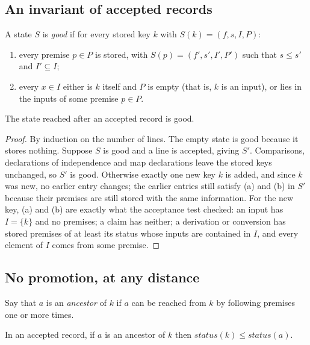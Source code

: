 \subsection{An invariant of accepted records}

\begin{definition}\label{def:good}
A state $S$ is \emph{good} if for every stored key $k$ with $S(k)=(f,s,I,P)$:
\begin{enumerate}[label=(\alph*),nosep,leftmargin=2em]
\item every premise $p\in P$ is stored, with $S(p)=(f',s',I',P')$ such that $s\le s'$ and $I'\subseteq I$;
\item every $x\in I$ either is $k$ itself and $P$ is empty (that is, $k$ is an input), or lies in the inputs of some premise $p\in P$.
\end{enumerate}
\end{definition}

\begin{theorem}\label{thm:good}
The state reached after an accepted record is good.
\end{theorem}

\begin{proof}
By induction on the number of lines. The empty state is good because it stores nothing. Suppose $S$ is good and a line is accepted,
giving $S'$. Comparisons, declarations of independence and map declarations leave the stored keys unchanged, so $S'$ is good. Otherwise
exactly one new key $k$ is added, and since $k$ was new, no earlier entry changes; the earlier entries still satisfy (a) and (b) in $S'$
because their premises are still stored with the same information. For the new key, (a) and (b) are exactly what the acceptance test
checked: an input has $I=\{k\}$ and no premises; a claim has neither; a derivation or conversion has stored premises of at least its
status whose inputs are contained in $I$, and every element of $I$ comes from some premise.
\end{proof}

\subsection{No promotion, at any distance}

Say that $a$ is an \emph{ancestor} of $k$ if $a$ can be reached from $k$ by following premises one or more times.

\begin{theorem}[No promotion]\label{thm:nopromotion}
In an accepted record, if $a$ is an ancestor of $k$ then $\mathit{status}(k)\le\mathit{status}(a)$.
\end{theorem}

